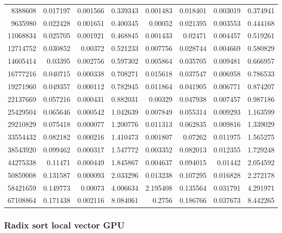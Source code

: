 \begin{longtable}{r r r r r r r r}
8388608 & 0.017197 & 0.001566 & 0.339343 & 0.001483 & 0.018401 & 0.003019 & 0.374941 \\
9635980 & 0.022428 & 0.001651 & 0.400345 & 0.00052 & 0.021395 & 0.003553 & 0.444168 \\
11068834 & 0.025705 & 0.001921 & 0.468845 & 0.001433 & 0.02471 & 0.004457 & 0.519261 \\
12714752 & 0.030852 & 0.00372 & 0.521233 & 0.007756 & 0.028744 & 0.004669 & 0.580829 \\
14605414 & 0.03395 & 0.002756 & 0.597302 & 0.005864 & 0.035705 & 0.009481 & 0.666957 \\
16777216 & 0.040715 & 0.000338 & 0.708271 & 0.015618 & 0.037547 & 0.006958 & 0.786533 \\
19271960 & 0.049357 & 0.000112 & 0.782945 & 0.011864 & 0.041905 & 0.006771 & 0.874207 \\
22137669 & 0.057216 & 0.000431 & 0.882031 & 0.00329 & 0.047938 & 0.007457 & 0.987186 \\
25429504 & 0.065646 & 0.000542 & 1.042639 & 0.007849 & 0.055314 & 0.009293 & 1.163599 \\
29210829 & 0.075418 & 0.000077 & 1.200776 & 0.011313 & 0.062835 & 0.009816 & 1.339029 \\
33554432 & 0.082182 & 0.000216 & 1.410473 & 0.001807 & 0.07262 & 0.011975 & 1.565275 \\
38543920 & 0.099462 & 0.000317 & 1.547772 & 0.003352 & 0.082013 & 0.012355 & 1.729248 \\
44275338 & 0.11471 & 0.000449 & 1.845867 & 0.004637 & 0.094015 & 0.01442 & 2.054592 \\
50859008 & 0.131587 & 0.000093 & 2.033296 & 0.013238 & 0.107295 & 0.016828 & 2.272178 \\
58421659 & 0.149773 & 0.00073 & 4.006634 & 2.195408 & 0.135564 & 0.031791 & 4.291971 \\
67108864 & 0.171438 & 0.002116 & 8.084061 & 0.2756 & 0.186766 & 0.037673 & 8.442265 \\
\end{longtable}

\subsubsection{Radix sort local vector GPU}

